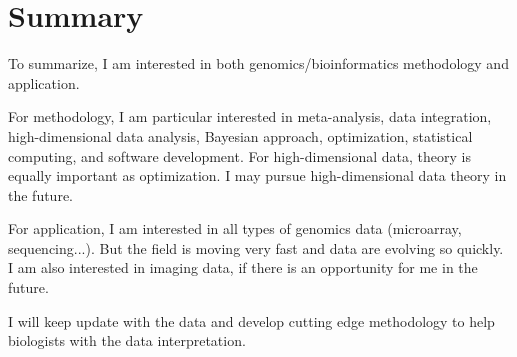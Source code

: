 \documentclass[a4paper, 10pt]{article}
\begin{document}
\section{Summary}
To summarize,
I am interested in both genomics/bioinformatics methodology and application.

For methodology, I am particular interested in
meta-analysis, data integration, high-dimensional data analysis, Bayesian approach, optimization, statistical computing, and software development.
For high-dimensional data, theory is equally important as optimization. I may pursue high-dimensional data theory in the future.

For application, I am interested in all types of genomics data (microarray, sequencing...).
But the field is moving very fast and data are evolving so quickly. 
I am also interested in imaging data, if there is an opportunity for me in the future.

I will keep update with the data and develop cutting edge methodology to help biologists with the data interpretation.
\end{document}
